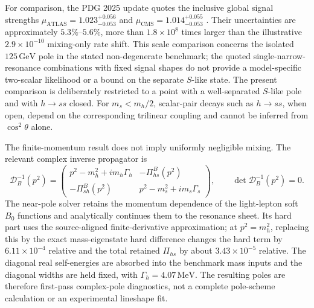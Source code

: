 \documentclass[12pt,a4paper]{article}
\begin{document}
For comparison, the PDG 2025 update quotes the inclusive global signal strengths \(\mu_{\mathrm{ATLAS}}=1.023^{+0.056}_{-0.053}\) and \(\mu_{\mathrm{CMS}}=1.014^{+0.055}_{-0.053}\) \cite{ParticleDataGroup:2024cfk}. Their uncertainties are approximately \(5.3\%\)--\(5.6\%\), more than \(1.8\times10^8\) times larger than the illustrative \(2.9\times10^{-10}\) mixing-only rate shift. This scale comparison concerns the isolated \(125\,\mathrm{GeV}\) pole in the stated non-degenerate benchmark; the quoted single-narrow-resonance combinations with fixed signal shapes do not provide a model-specific two-scalar likelihood or a bound on the separate \(S\)-like state. The present comparison is deliberately restricted to a point with a well-separated \(S\)-like pole and with \(h\to ss\) closed. For \(m_s<m_h/2\), scalar-pair decays such as \(h\to ss\), when open, depend on the corresponding trilinear coupling and cannot be inferred from \(\cos^2\theta\) alone.

The finite-momentum result does not imply uniformly negligible mixing. The relevant complex inverse propagator is
\[
\mathcal D_B^{-1}(p^2)=
\begin{pmatrix}
p^2-m_h^2+i m_h\Gamma_h&-\Pi_{hs}^{B}(p^2)\\
-\Pi_{sh}^{B}(p^2)&p^2-m_s^2+i m_s\Gamma_s
\end{pmatrix},
\qquad
\det\mathcal D_B^{-1}(p^2)=0.
\]
The near-pole solver retains the momentum dependence of the light-lepton soft \(B_0\) functions and analytically continues them to the resonance sheet. Its hard part uses the source-aligned finite-derivative approximation; at \(p^2=m_h^2\), replacing this by the exact mass-eigenstate hard difference changes the hard term by \(6.11\times10^{-4}\) relative and the total retained \(\Pi_{hs}\) by about \(3.43\times10^{-5}\) relative. The diagonal real self-energies are absorbed into the benchmark mass inputs and the diagonal widths are held fixed, with \(\Gamma_h=4.07\,\mathrm{MeV}\). The resulting poles are therefore first-pass complex-pole diagnostics, not a complete pole-scheme calculation or an experimental lineshape fit.
\end{document}
